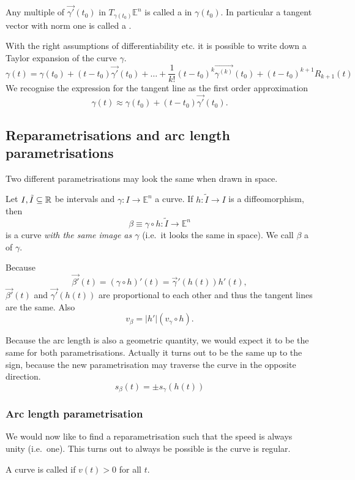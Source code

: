 Any multiple of $\vec{\gamma'}(t_0)$ in $T_{\gamma(t_0)}\mathbb{E}^n$ is called a  in $\gamma(t_0)$. In particular a tangent vector with norm one is called a .

\begin{note}
With the right assumptions of differentiability etc. it is possible to write down a Taylor expansion of the curve $\gamma$.
\[ \gamma(t) = \gamma(t_0) + (t-t_0)\vec{\gamma'}(t_0) + \ldots + \frac{1}{k!}(t-t_0)^k\vec{\gamma^{(k)}}(t_0) + (t-t_0)^{k+1}R_{k+1}(t) \]
We recognise the expression for the tangent line as the first order approximation
\[ \gamma(t) \approx \gamma(t_0) + (t-t_0)\vec{\gamma'}(t_0). \]
\end{note}

\subsection{Reparametrisations and arc length parametrisations}
Two different parametrisations may look the same when drawn in space.

\begin{definition}
Let $I, \tilde{I} \subseteq \mathbb{R}$ be intervals and $\gamma: I \to \mathbb{E}^n$ a curve.
If $h: \tilde{I} \to I$ is a diffeomorphism, then 
\[ \beta \equiv \gamma \circ h: \tilde{I} \to \mathbb{E}^n \]
is a curve \textit{with the same image as $\gamma$} (i.e.\ it looks the same in space). We call $\beta$ a  of $\gamma$.
\end{definition}
Because
\[ \vec{\beta'}(t) = (\gamma\circ h)'(t) = \vec{\gamma}'(h(t))h'(t), \]
$\vec{\beta'}(t)$ and $\vec{\gamma'}(h(t))$ are proportional to each other and thus the tangent lines are the same. Also
\[ v_\beta = |h'|(v_\gamma\circ h). \]

Because the arc length is also a geometric quantity, we would expect it to be the same for both parametrisations. Actually it turns out to be the same up to the sign, because the new parametrisation may traverse the curve in the opposite direction.
\[ s_\beta(t) = \pm s_\gamma(h(t)) \]

\subsubsection{Arc length parametrisation}
We would now like to find a reparametrisation such that the speed is always unity (i.e.\ one). This turns out to always be possible is the curve is regular.
\begin{definition}
A curve is called  if $v(t) > 0$ for all $t$.
\end{definition}

